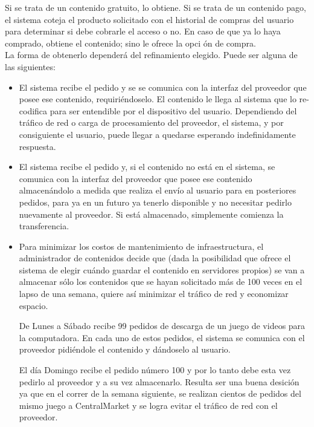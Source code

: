 \documentclass[11pt, a4paper, spanish]{article}
\begin{document}
       Si se trata de un contenido gratuito, lo obtiene. Si se trata de un contenido pago, el sistema coteja el producto solicitado con el historial de 
   compras del usuario para determinar si debe cobrarle el acceso o no. En caso de que ya lo haya comprado, obtiene el contenido; sino le ofrece la opci
   \'on de compra.\\
   La forma de obtenerlo depender\'a del refinamiento elegido. Puede ser alguna de las siguientes:

	\begin{itemize}
	
	\item{ El sistema recibe el pedido y se se comunica con la interfaz del proveedor que posee ese contenido, requiri\'endoselo. El contenido le 
   llega al sistema que lo re-codifica para ser entendible por el dispositivo del usuario. Dependiendo del tr\'afico de red o carga de procesamiento 
   del proveedor, el sistema, y por consiguiente el usuario, puede llegar a quedarse esperando indefinidamente respuesta.}

	\item{ El sistema recibe el pedido y, si el contenido no est\'a en el sistema, se comunica con la interfaz del proveedor que posee ese 
   contenido almacen\'andolo a medida que realiza el env\'io al usuario para en posteriores pedidos, para ya en un futuro ya tenerlo disponible y no 
   necesitar pedirlo nuevamente al proveedor. Si est\'a almacenado, simplemente comienza la transferencia.}

	\item{ Para minimizar los costos de mantenimiento de infraestructura, el administrador de contenidos decide que (dada la posibilidad que ofrece 
   el sistema de elegir cu\'ando guardar el contenido en servidores propios) se van a almacenar s\'olo los contenidos que se hayan solicitado m\'as de 
   100 veces en el lapso de una semana, quiere as\'i minimizar el tr\'afico de red y economizar espacio.}

	De Lunes a S\'abado recibe 99 pedidos de descarga de un juego de videos para la computadora. En cada uno de estos pedidos, el sistema se 
   comunica con el proveedor pidi\'endole el contenido y d\'andoselo al usuario.

	El d\'ia Domingo recibe el pedido n\'umero 100 y por lo tanto debe esta vez pedirlo al proveedor y a su vez almacenarlo. Resulta ser una buena 
   desici\'on ya que en el correr de la semana siguiente, se realizan cientos de pedidos del mismo juego a CentralMarket y se logra evitar el tr\'afico 
   de red con el proveedor.

	\end{itemize}
\end{document}
